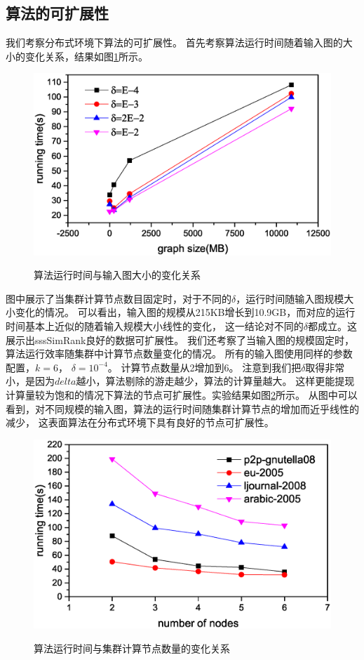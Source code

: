 \documentclass[master]{njuthesis}
\begin{document}
\subsection{算法的可扩展性}
我们考察分布式环境下算法的可扩展性。 首先考察算法运行时间随着输入图的大小的变化关系，结果如图\ref{fig:ch1:data_scalable}所示。
\begin{figure}[h]
  \centering
  \includegraphics[width= 1\textwidth]{figure/data_scalability.eps}\\
  \caption{算法运行时间与输入图大小的变化关系}\label{fig:ch1:data_scalable}
\end{figure}

图中展示了当集群计算节点数目固定时，对于不同的$\delta$，运行时间随输入图规模大小变化的情况。 
可以看出，输入图的规模从215KB增长到10.9GB，而对应的运行时间基本上近似的随着输入规模大小线性的变化，
这一结论对不同的$\delta$都成立。这展示出sssSimRank良好的数据可扩展性。
我们还考察了当输入图的规模固定时，算法运行效率随集群中计算节点数量变化的情况。
所有的输入图使用同样的参数配置，$k=6$， $\delta=10^{-4}$。 计算节点数量从2增加到6。
注意到我们把$\delta$取得非常小，是因为$delta$越小，算法剔除的游走越少，算法的计算量越大。
这样更能提现计算量较为饱和的情况下算法的节点可扩展性。实验结果如图\ref{fig:ch1:node_scalable}所示。
从图中可以看到，对不同规模的输入图，算法的运行时间随集群计算节点的增加而近乎线性的减少，
这表面算法在分布式环境下具有良好的节点可扩展性。
\begin{figure}[h]
  \centering
  \includegraphics[width= 1\textwidth]{figure/node_scalability.eps}\\
  \caption{算法运行时间与集群计算节点数量的变化关系}\label{fig:ch1:node_scalable}
\end{figure}
\end{document}
